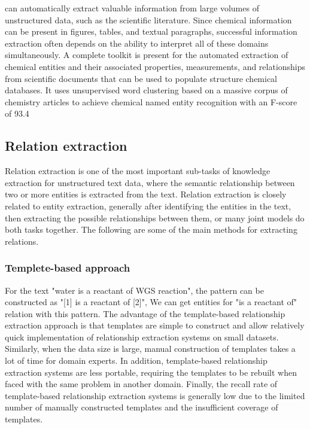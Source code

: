 \documentclass[%
 aip,
 jmp,%
 amsmath,amssymb,
 reprint,%
]{revtex4-2}
\begin{document}
can automatically extract valuable information from large volumes of unstructured
data, such as the scientific literature. Since chemical information can be present
in figures, tables, and textual paragraphs, successful information extraction often
depends on the ability to interpret all of these domains simultaneously. A complete
toolkit is present for the automated extraction of chemical entities and their associated
properties, measurements, and relationships from scientific documents that can be used
to populate structure chemical databases\cite{swain2016chemdataextractor}. It uses unsupervised word clustering based on
a massive corpus of chemistry  articles to achieve chemical named entity recognition with an 
F-score of 93.4%

\subsection{Relation extraction}
Relation extraction is one of the most important sub-tasks of knowledge extraction for 
unstructured text data, where the semantic relationship between two or more entities is extracted 
from the text. Relation extraction is closely related to entity extraction, generally after 
identifying the entities in the text, then extracting the possible relationships between them, 
or many joint models do both tasks together. The following are some of the main methods
for extracting relations.

\subsubsection{Templete-based approach}
For the text "water is a reactant of WGS reaction", the pattern can be constructed as "[1] is a reactant of [2]",
We can get entities for "is a reactant of" relation with this pattern. The advantage of the template-based relationship 
extraction approach is that templates are simple to construct and allow relatively quick implementation of relationship 
extraction systems on small datasets. Similarly, when the data size is large, manual construction of templates takes 
a lot of time for domain experts. In addition, template-based relationship extraction systems are less portable, 
requiring the templates to be rebuilt when faced with the same problem in another domain. 
Finally, the recall rate of template-based relationship extraction systems is generally low due to 
the limited number of manually constructed templates and the insufficient coverage of templates.
\end{document}
